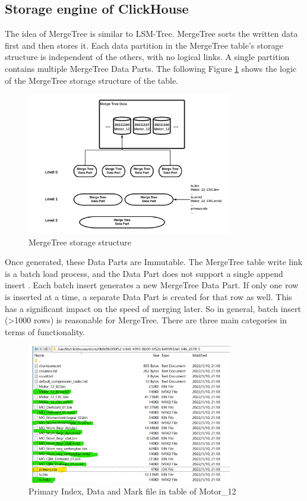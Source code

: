 \subsection{Storage engine of ClickHouse}

The idea of MergeTree is similar to LSM-Tree. MergeTree sorts the written data first and then stores it. Each data partition in the MergeTree table's storage structure is independent of the others, with no logical links. A single partition contains multiple MergeTree Data Parts. The following Figure \ref{fig:ch_structure} shows the logic of the MergeTree storage structure of the table.

\begin{figure}[hbt!]
	\centering
 	\includegraphics[width=0.8\textwidth]{gfx/ch_structure.png}
	\caption{MergeTree storage structure}
	\label{fig:ch_structure}
\end{figure}


Once generated, these Data Parts are Immutable. The MergeTree table write link is a batch load process, and the Data Part does not support a single append insert \cite{alibaba_cloud_community}. Each batch insert generates a new MergeTree Data Part. If only one row is inserted at a time, a separate Data Part is created for that row as well. This has a significant impact on the speed of merging later. So in general, batch insert (>1000 rows) is reasonable for MergeTree. There are three main categories in terms of functionality.

\begin{figure}[hbt!]
	\centering
 	\includegraphics[width=0.8\textwidth]{gfx/ch_bin_mrk_idx.png}
	\caption{Primary Index, Data and Mark file in table of Motor\_12}
	\label{fig:motor_12_primary_mark}
\end{figure}

